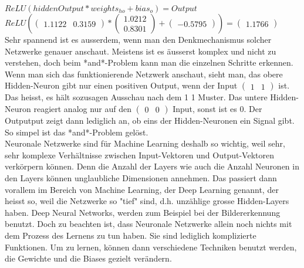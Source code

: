 \documentclass[11pt,a4paper,ngerman]{article}
\begin{document}
$ ReLU(hiddenOutput * weights_{ho} + bias_o) = Output $\\

$ReLU(\left(\begin{array}{cc} 1.1122 & 0.3159\end{array}\right) * \left(\begin{array}{cc} 1.0212\\ 0.8301\end{array}\right) + \left(\begin{array}{cc} -0.5795\end{array}\right)) = \left(\begin{array}{cc}  1.1766\end{array}\right)$\\

Sehr spannend ist es ausserdem, wenn man den Denkmechanismus solcher Netzwerke genauer anschaut. Meistens ist es äusserst komplex und nicht zu verstehen, doch beim *and*-Problem kann man die einzelnen Schritte erkennen. Wenn man sich das funktionierende Netzwerk anschaut, sieht man, das obere Hidden-Neuron gibt nur einen positiven Output, wenn der Input $ \left(\begin{array}{cc} 1 & 1\end{array}\right) $ ist. Das heisst, es hält sozusagen Ausschau nach dem 1 1 Muster. Das untere Hidden-Neuron reagiert analog nur auf den $ \left(\begin{array}{cc} 0 & 0\end{array}\right) $ Input, sonst ist es 0. Der Outputput zeigt dann lediglich an, ob eins der Hidden-Neuronen ein Signal gibt. So simpel ist das *and*-Problem gelöst.\\

Neuronale Netzwerke sind für Machine Learning deshalb so wichtig, weil sehr, sehr komplexe Verhältnisse zwischen Input-Vektoren und Output-Vektoren verkörpern können. Denn die Anzahl der Layers wie auch die Anzahl Neuronen in den Layers können unglaubliche Dimensionen annehmen. Das passiert dann vorallem im Bereich von Machine Learning, der Deep Learning genannt, der heisst so, weil die Netzwerke so "tief" sind, d.h. unzählige grosse Hidden-Layers haben. Deep Neural Networks, werden zum Beispiel bei der Bildererkennung benutzt. Doch zu beachten ist, dass Neuronale Netzwerke allein noch nichts mit dem Prozess des Lernens zu tun haben. Sie sind lediglich komplizierte Funktionen. Um zu lernen, können dann verschiedene Techniken benutzt werden, die Gewichte und die Biases gezielt verändern.
\end{document}
